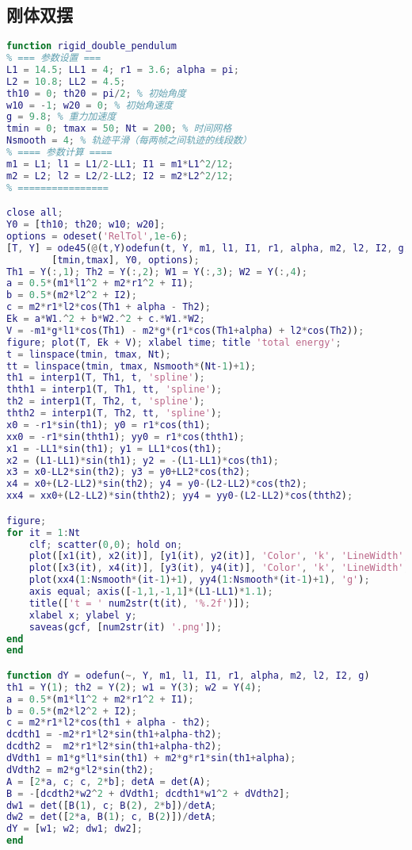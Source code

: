 \subsection{刚体双摆}
\begin{lstlisting}[language=matlab, caption=rigid_double_pendulum.m]
% 刚体双摆
function rigid_double_pendulum
% === 参数设置 ===
L1 = 14.5; LL1 = 4; r1 = 3.6; alpha = pi;
L2 = 10.8; LL2 = 4.5;
th10 = 0; th20 = pi/2; % 初始角度
w10 = -1; w20 = 0; % 初始角速度
g = 9.8; % 重力加速度
tmin = 0; tmax = 50; Nt = 200; % 时间网格
Nsmooth = 4; % 轨迹平滑（每两帧之间轨迹的线段数）
% ==== 参数计算 ====
m1 = L1; l1 = L1/2-LL1; I1 = m1*L1^2/12;
m2 = L2; l2 = L2/2-LL2; I2 = m2*L2^2/12;
% ================

close all;
Y0 = [th10; th20; w10; w20];
options = odeset('RelTol',1e-6);
[T, Y] = ode45(@(t,Y)odefun(t, Y, m1, l1, I1, r1, alpha, m2, l2, I2, g), ...
        [tmin,tmax], Y0, options);
Th1 = Y(:,1); Th2 = Y(:,2); W1 = Y(:,3); W2 = Y(:,4);
a = 0.5*(m1*l1^2 + m2*r1^2 + I1);
b = 0.5*(m2*l2^2 + I2);
c = m2*r1*l2*cos(Th1 + alpha - Th2);
Ek = a*W1.^2 + b*W2.^2 + c.*W1.*W2;
V = -m1*g*l1*cos(Th1) - m2*g*(r1*cos(Th1+alpha) + l2*cos(Th2));
figure; plot(T, Ek + V); xlabel time; title 'total energy';
t = linspace(tmin, tmax, Nt);
tt = linspace(tmin, tmax, Nsmooth*(Nt-1)+1);
th1 = interp1(T, Th1, t, 'spline');
thth1 = interp1(T, Th1, tt, 'spline');
th2 = interp1(T, Th2, t, 'spline');
thth2 = interp1(T, Th2, tt, 'spline');
x0 = -r1*sin(th1); y0 = r1*cos(th1);
xx0 = -r1*sin(thth1); yy0 = r1*cos(thth1);
x1 = -LL1*sin(th1); y1 = LL1*cos(th1);
x2 = (L1-LL1)*sin(th1); y2 = -(L1-LL1)*cos(th1);
x3 = x0-LL2*sin(th2); y3 = y0+LL2*cos(th2);
x4 = x0+(L2-LL2)*sin(th2); y4 = y0-(L2-LL2)*cos(th2);
xx4 = xx0+(L2-LL2)*sin(thth2); yy4 = yy0-(L2-LL2)*cos(thth2);

figure;
for it = 1:Nt
    clf; scatter(0,0); hold on;
    plot([x1(it), x2(it)], [y1(it), y2(it)], 'Color', 'k', 'LineWidth', 2);
    plot([x3(it), x4(it)], [y3(it), y4(it)], 'Color', 'k', 'LineWidth', 2);
    plot(xx4(1:Nsmooth*(it-1)+1), yy4(1:Nsmooth*(it-1)+1), 'g');
    axis equal; axis([-1,1,-1,1]*(L1-LL1)*1.1);
    title(['t = ' num2str(t(it), '%.2f')]);
    xlabel x; ylabel y;
    saveas(gcf, [num2str(it) '.png']);
end
end

function dY = odefun(~, Y, m1, l1, I1, r1, alpha, m2, l2, I2, g)
th1 = Y(1); th2 = Y(2); w1 = Y(3); w2 = Y(4);
a = 0.5*(m1*l1^2 + m2*r1^2 + I1);
b = 0.5*(m2*l2^2 + I2);
c = m2*r1*l2*cos(th1 + alpha - th2);
dcdth1 = -m2*r1*l2*sin(th1+alpha-th2);
dcdth2 =  m2*r1*l2*sin(th1+alpha-th2);
dVdth1 = m1*g*l1*sin(th1) + m2*g*r1*sin(th1+alpha);
dVdth2 = m2*g*l2*sin(th2);
A = [2*a, c; c, 2*b]; detA = det(A);
B = -[dcdth2*w2^2 + dVdth1; dcdth1*w1^2 + dVdth2];
dw1 = det([B(1), c; B(2), 2*b])/detA;
dw2 = det([2*a, B(1); c, B(2)])/detA;
dY = [w1; w2; dw1; dw2];
end
\end{lstlisting}
